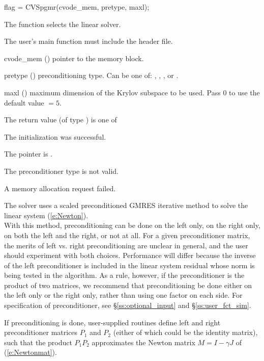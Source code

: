 {
  flag = CVSpgmr(cvode\_mem, pretype, maxl);
}
{
  The function  selects the {\cvspgmr} linear solver. 

  The user's main function must include the  header file.
}
{
  \begin{args}
  \item[cvode\_mem] ()
    pointer to the {\cvodes} memory block.
  \item[pretype] ()
    preconditioning type. Can be one of: , , , or .
  \item[maxl] ()
    maximum dimension of the Krylov subspace to be used. Pass $0$ to use the 
    default value $=5$.
  \end{args}
}
{
  The return value  (of type ) is one of
  \begin{args}
  \item[\Id{SUCCESS}] 
    The {\cvspgmr} initialization was successful.
  \item[\Id{LIN\_NO\_MEM}]
    The  pointer is .
  \item[\Id{LIN\_ILL\_INPUT}]
    The preconditioner type  is not valid.
  \item[\Id{LMEM\_FAIL}]
    A memory allocation request failed.
  \end{args}
}
{
  The {\cvspgmr} solver uses a scaled preconditioned GMRES
  iterative method to solve the linear system (\ref{e:Newton}).\\
  With this {\spgmr} method, preconditioning 
  can be done on the left only, on the right only, on both the left and the right, 
  or not at all.  For a given preconditioner matrix, the merits of left vs. right
  preconditioning are unclear in general, and the user should experiment
  with both choices.  Performance will differ because the inverse of the
  left preconditioner is included in the linear system residual whose
  norm is being tested in the {\spgmr} algorithm.  As a rule, however, if
  the preconditioner is the product of two matrices, we recommend that
  preconditioning be done either on the left only or the right only,
  rather than using one factor on each side. For specification of preconditioner,
  see \S\ref{ss:optional_input} and \S\ref{ss:user_fct_sim}.

  If preconditioning is done, user-supplied routines define left and right 
  preconditioner matrices $P_1$ and $P_2$ (either of which could be the identity matrix),
  such that the product $P_1 P_2$ approximates the Newton matrix $M=I-\gamma J$ of 
  (\ref{e:Newtonmat}).
}

